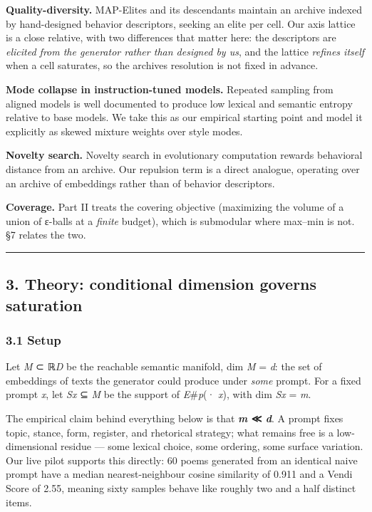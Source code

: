 \documentclass[
  11pt,
]{article}
\theoremstyle{plain}
\theoremstyle{definition}
\begin{document}
\textbf{Quality-diversity.} MAP-Elites and its descendants maintain an
archive indexed by hand-designed behavior descriptors, seeking an elite
per cell. Our axis lattice is a close relative, with two differences
that matter here: the descriptors are \emph{elicited from the generator
rather than designed by us}, and the lattice \emph{refines itself} when
a cell saturates, so the archive\textquotesingle s resolution is not
fixed in advance.

\textbf{Mode collapse in instruction-tuned models.} Repeated sampling
from aligned models is well documented to produce low lexical and
semantic entropy relative to base models. We take this as our empirical
starting point and model it explicitly as skewed mixture weights over
style modes.

\textbf{Novelty search.} Novelty search in evolutionary computation
rewards behavioral distance from an archive. Our repulsion term is a
direct analogue, operating over an archive of embeddings rather than of
behavior descriptors.

\textbf{Coverage.} Part II treats the covering objective (maximizing the
volume of a union of ε-balls at a \emph{finite} budget), which is
submodular where max--min is not. §7 relates the two.

\begin{center}\rule{0.5\linewidth}{0.5pt}\end{center}

\subsection{3. Theory: conditional dimension governs
saturation}\label{3-theory-conditional-dimension-governs-saturation}

\subsubsection{3.1 Setup}\label{31-setup}

Let \emph{M} ⊂ ℝ\emph{D} be the reachable semantic manifold, dim
\emph{M} = \emph{d}: the set of embeddings of texts the generator could
produce under \emph{some} prompt. For a fixed prompt \emph{x}, let
\emph{Sx} ⊆ \emph{M} be the support of \emph{E}\#\emph{p}(· \textbar{}
\emph{x}), with dim \emph{Sx} = \emph{m}.

The empirical claim behind everything below is that \textbf{\emph{m} ≪
\emph{d}}. A prompt fixes topic, stance, form, register, and rhetorical
strategy; what remains free is a low-dimensional residue --- some
lexical choice, some ordering, some surface variation. Our live pilot
supports this directly: 60 poems generated from an identical naive
prompt have a median nearest-neighbour cosine similarity of 0.911 and a
Vendi Score of 2.55, meaning sixty samples behave like roughly two and a
half distinct items.
\end{document}
